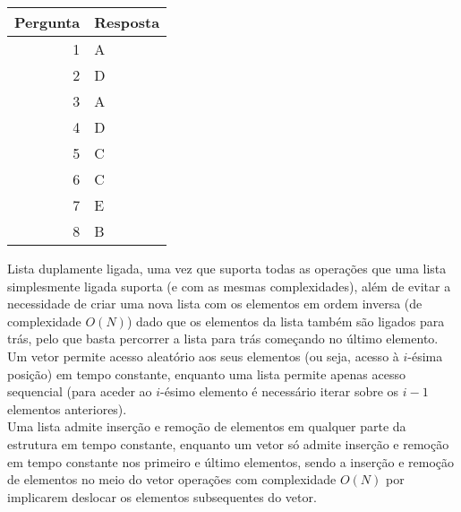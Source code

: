 \setcounter{chapter}{17}
\begin{center}
\begin{tabular}{r | l}
	Pergunta & Resposta \\ \hline
	1 & A \\
	2 & D \\
	3 & A \\
	4 & D \\
	5 & C \\
	6 & C \\
	7 & E \\
	8 & B
\end{tabular}
\end{center}
Lista duplamente ligada, uma vez que suporta todas as operações que uma lista simplesmente ligada suporta (e com as mesmas complexidades), além de evitar a necessidade de criar uma nova lista com os elementos em ordem inversa (de complexidade $O(N)$) dado que os elementos da lista também são ligados para trás, pelo que basta percorrer a lista para trás começando no último elemento.
Um vetor permite acesso aleatório aos seus elementos (ou seja, acesso à $i$-ésima posição) em tempo constante, enquanto uma lista permite apenas acesso sequencial (para aceder ao $i$-ésimo elemento é necessário iterar sobre os $i-1$ elementos anteriores).\\
Uma lista admite inserção e remoção de elementos em qualquer parte da estrutura em tempo constante, enquanto um vetor só admite inserção e remoção em tempo constante nos primeiro e último elementos, sendo a inserção e remoção de elementos no meio do vetor operações com complexidade $O(N)$ por implicarem deslocar os elementos subsequentes do vetor.

